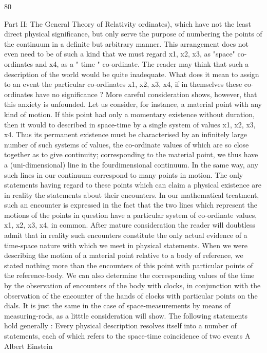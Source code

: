 \documentclass{article}
\begin{document}
80

Part II: The General Theory of Relativity
ordinates), which have not the least direct physical significance, but only serve the purpose
of numbering the points of the continuum in a definite but arbitrary manner. This
arrangement does not even need to be of such a kind that we must regard x1, x2, x3, as
"space" co-ordinates and x4, as a " time " co-ordinate.
The reader may think that such a description of the world would be quite inadequate.
What does it mean to assign to an event the particular co-ordinates x1, x2, x3, x4, if in
themselves these co-ordinates have no significance ? More careful consideration shows,
however, that this anxiety is unfounded. Let us consider, for instance, a material point with
any kind of motion. If this point had only a momentary existence without duration, then it
would to described in space-time by a single system of values x1, x2, x3, x4. Thus its
permanent existence must be characterised by an infinitely large number of such systems of
values, the co-ordinate values of which are so close together as to give continuity;
corresponding to the material point, we thus have a (uni-dimensional) line in the fourdimensional continuum. In the same way, any such lines in our continuum correspond to
many points in motion. The only statements having regard to these points which can claim a
physical existence are in reality the statements about their encounters. In our mathematical
treatment, such an encounter is expressed in the fact that the two lines which represent the
motions of the points in question have a particular system of co-ordinate values, x1, x2, x3,
x4, in common. After mature consideration the reader will doubtless admit that in reality
such encounters constitute the only actual evidence of a time-space nature with which we
meet in physical statements.
When we were describing the motion of a material point relative to a body of reference,
we stated nothing more than the encounters of this point with particular points of the
reference-body. We can also determine the corresponding values of the time by the
observation of encounters of the body with clocks, in conjunction with the observation of
the encounter of the hands of clocks with particular points on the dials. It is just the same in
the case of space-measurements by means of measuring-rods, as a litttle consideration will
show.
The following statements hold generally : Every physical description resolves itself into a
number of statements, each of which refers to the space-time coincidence of two events A
Albert Einstein
\end{document}
